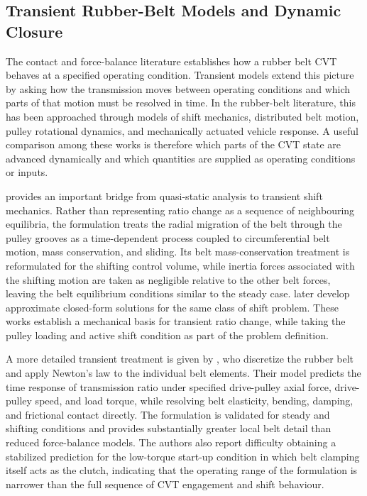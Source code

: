 \documentclass[11pt]{report}
\numberwithin{equation}{section}
\begin{document}
\subsection{Transient Rubber-Belt Models and Dynamic Closure}
\label{sec:lit-transient-rubber}

The contact and force-balance literature establishes how a rubber belt CVT behaves at a specified operating condition. Transient models extend this picture by asking how the transmission moves between operating conditions and which parts of that motion must be resolved in time. In the rubber-belt literature, this has been approached through models of shift mechanics, distributed belt motion, pulley rotational dynamics, and mechanically actuated vehicle response. A useful comparison among these works is therefore which parts of the CVT state are advanced dynamically and which quantities are supplied as operating conditions or inputs.

\citet{Sorge2008} provides an important bridge from quasi-static analysis to
transient shift mechanics. Rather than representing ratio change as a sequence
of neighbouring equilibria, the formulation treats the radial migration of the
belt through the pulley grooves as a time-dependent process coupled to
circumferential belt motion, mass conservation, and sliding. Its belt
mass-conservation treatment is reformulated for the shifting control volume,
while inertia forces associated with the shifting motion are taken as
negligible relative to the other belt forces, leaving the belt equilibrium
conditions similar to the steady case. \citet{CammalleriSorge2009} later
develop approximate closed-form solutions for the same class of shift problem.
These works establish a mechanical basis for transient ratio change, while
taking the pulley loading and active shift condition as part of the problem
definition.

A more detailed transient treatment is given by \citet{JulioPlante2011}, who discretize the rubber belt and apply Newton's law to the individual belt elements. Their model predicts the time response of transmission ratio under specified drive-pulley axial force, drive-pulley speed, and load torque, while resolving belt elasticity, bending, damping, and frictional contact directly. The formulation is validated for steady and shifting conditions and provides substantially greater local belt detail than reduced force-balance models. The authors also report difficulty obtaining a stabilized prediction for the low-torque start-up condition in which belt clamping itself acts as the clutch, indicating that the operating range of the formulation is narrower than the full sequence of CVT engagement and shift behaviour.
\end{document}
